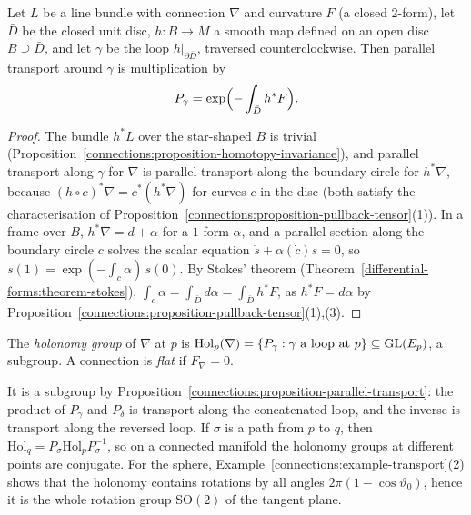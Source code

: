 \begin{proposition}\label{connections:proposition-line-holonomy}
Let $L$ be a line bundle with connection $\nabla$ and curvature $F$ (a closed $2$-form), let $\bar D$ be the closed unit disc, $h \colon B \to M$ a smooth map defined on an
open disc $B \supseteq \bar D$, and let $\gamma$ be the loop $h|_{\partial\bar D}$, traversed counterclockwise. Then parallel transport around $\gamma$ is multiplication by
\[
P_\gamma = \exp\Bigl(-\int_{\bar D}h^*F\Bigr).
\]
\end{proposition}

\begin{proof}
The bundle $h^*L$ over the star-shaped $B$ is trivial (Proposition~\ref{connections:proposition-homotopy-invariance}), and
parallel transport along $\gamma$ for $\nabla$ is parallel transport along the boundary circle for $h^*\nabla$, because $(h \circ c)^*\nabla = c^*(h^*\nabla)$ for curves $c$ in the
disc (both satisfy the characterisation of Proposition~\ref{connections:proposition-pullback-tensor}(1)). In a frame over $B$, $h^*\nabla = d + \alpha$ for a $1$-form $\alpha$, and a
parallel section along the boundary circle $c$ solves the scalar equation $\dot s + \alpha(\dot c)s = 0$, so $s(1) = \exp(-\int_c\alpha)\,s(0)$. By Stokes' theorem
(Theorem~\ref{differential-forms:theorem-stokes}), $\int_c\alpha = \int_{\bar D}d\alpha = \int_{\bar D}h^*F$, as $h^*F = d\alpha$ by
Proposition~\ref{connections:proposition-pullback-tensor}(1),(3).
\end{proof}

\begin{definition}\label{connections:definition-holonomy}
The \emph{holonomy group} of $\nabla$ at $p$ is $\mathrm{Hol}_p(\nabla) = \{P_\gamma : \gamma \text{ a loop at } p\} \subseteq \mathrm{GL}(E_p)$, a subgroup. A connection is \emph{flat} if $F_\nabla = 0$.
\end{definition}

It is a subgroup by Proposition~\ref{connections:proposition-parallel-transport}: the product of $P_\gamma$ and $P_\delta$ is transport along the concatenated loop, and the inverse is
transport along the reversed loop. If $\sigma$ is a path from $p$ to $q$, then $\mathrm{Hol}_q = P_\sigma\mathrm{Hol}_pP_\sigma^{-1}$, so on a connected manifold the holonomy groups at
different points are conjugate. For the sphere, Example~\ref{connections:example-transport}(2) shows that the holonomy contains rotations by all angles $2\pi(1 - \cos\vartheta_0)$,
hence it is the whole rotation group $\mathrm{SO}(2)$ of the tangent plane.

